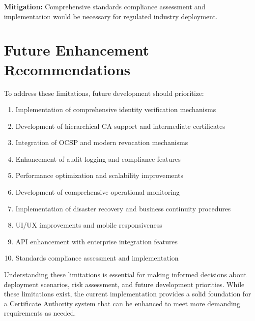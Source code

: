 \textbf{Mitigation:} Comprehensive standards compliance assessment and implementation would be necessary for regulated industry deployment.

\section{Future Enhancement Recommendations}

To address these limitations, future development should prioritize:

\begin{enumerate}
    \item Implementation of comprehensive identity verification mechanisms
    \item Development of hierarchical CA support and intermediate certificates
    \item Integration of OCSP and modern revocation mechanisms
    \item Enhancement of audit logging and compliance features
    \item Performance optimization and scalability improvements
    \item Development of comprehensive operational monitoring
    \item Implementation of disaster recovery and business continuity procedures
    \item UI/UX improvements and mobile responsiveness
    \item API enhancement with enterprise integration features
    \item Standards compliance assessment and implementation
\end{enumerate}

Understanding these limitations is essential for making informed decisions about deployment scenarios, risk assessment, and future development priorities. While these limitations exist, the current implementation provides a solid foundation for a Certificate Authority system that can be enhanced to meet more demanding requirements as needed.